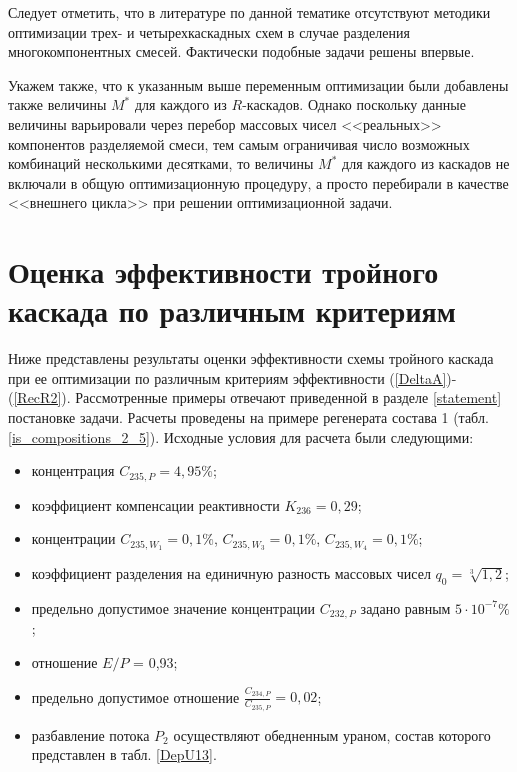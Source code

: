 Следует отметить, что в литературе по данной тематике отсутствуют методики оптимизации трех- и четырехкаскадных схем в случае разделения многокомпонентных смесей. Фактически подобные задачи решены впервые.

Укажем также, что к указанным выше переменным оптимизации были добавлены также величины $M^{*}$ для каждого из $R$-каскадов. Однако поскольку данные величины варьировали через перебор массовых чисел <<реальных>> компонентов разделяемой смеси, тем самым ограничивая число возможных комбинаций несколькими десятками, то величины  $M^{*}$ для каждого из каскадов не включали в общую оптимизационную процедуру, а просто перебирали в качестве <<внешнего цикла>> при решении оптимизационной задачи.

\section{Оценка эффективности тройного каскада по различным критериям}\label{MDKefficiency}

Ниже представлены результаты оценки эффективности схемы тройного каскада при ее оптимизации по различным критериям эффективности (\ref{DeltaA})-(\ref{RecR2}). Рассмотренные примеры отвечают приведенной в разделе \ref{statement} постановке задачи. Расчеты проведены на примере регенерата состава 1  (табл. \ref{is_compositions_2_5}). Исходные условия для расчета были следующими:

\begin{itemize}
    \item концентрация $C_{235,{P}} = {4,95\%}$; 
    \item коэффициент компенсации реактивности $K_{236}=0,29$;
    \item концентрации $C_{235,{W_1}} = 0,1\%$, $C_{235,{W_3}} = 0,1\%$, $C_{235,{W_4}} = 0,1\%$;
    \item коэффициент разделения на единичную разность массовых чисел $q_{0} = \sqrt[3]{1,2}$;
    \item предельно допустимое значение концентрации $C_{232,{P}}$ задано равным $5\cdot10^{-7} \%$;
    \item отношение $E/P$ = 0,93;
    \item предельно допустимое отношение $\frac{C_{234,{P}}}{C_{235,{P}}} = 0,02$;
    \item разбавление потока $P_2$ осуществляют обедненным ураном, состав которого представлен в табл. \ref{DepU13}.
\end{itemize}

